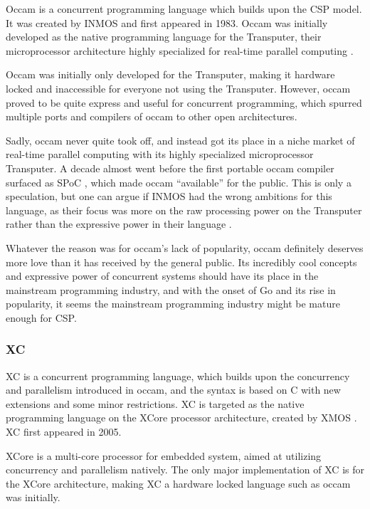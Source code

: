 Occam is a concurrent programming language which builds upon the CSP model. It was created by INMOS \citep{occam} and first appeared in 1983. Occam was initially developed as the native programming language for the Transputer, their microprocessor architecture highly specialized for real-time parallel computing \citep{transputer}. 

Occam was initially only developed for the Transputer, making it hardware locked and inaccessible for everyone not using the Transputer. However, occam proved to be quite express and useful for concurrent programming, which spurred multiple ports and compilers of occam to other open architectures. 

Sadly, occam never quite took off, and instead got its place in a niche market of real-time parallel computing with its highly specialized microprocessor Transputer. A decade almost went before the first portable occam compiler surfaced as SPoC \citep{spoc}, which made occam ``available'' for the public. This is only a speculation, but one can argue if INMOS had the wrong ambitions for this language, as their focus was more on the raw processing power on the Transputer rather than the expressive power in their language \citep{occam}. 

Whatever the reason was for occam's lack of popularity, occam definitely deserves more love than it has received by the general public. Its incredibly cool concepts and expressive power of concurrent systems should have its place in the mainstream programming industry, and with the onset of Go and its rise in popularity, it seems the mainstream programming industry might be mature enough for CSP.


\subsubsection{XC}
\label{sssec:xc}

XC is a concurrent programming language, which builds upon the concurrency and parallelism introduced in occam, and the syntax is based on C with new extensions and some minor restrictions. XC is targeted as the native programming language on the XCore processor architecture, created by XMOS \citep{xc}. XC first appeared in 2005.

XCore is a multi-core processor for embedded system, aimed at utilizing concurrency and parallelism natively. The only major implementation of XC is for the XCore architecture, making XC a hardware locked language such as occam was initially. 

